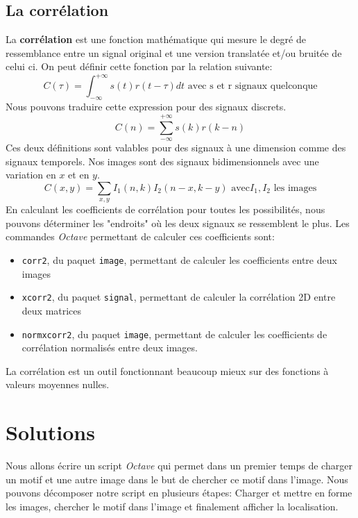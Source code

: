 \documentclass[a4paper,12pt,titlepage]{report}
\newcommand{\octave}{\textit{Octave }}
\begin{document}
		\subsection{La corrélation}
		La \textbf{corrélation} est une fonction mathématique qui mesure le degré de ressemblance entre un signal original et une version translatée et/ou bruitée de celui ci. On peut définir cette fonction par la relation suivante:
		\begin{equation}
			C(\tau)=\int_{-\infty}^{+\infty}s(t)r(t-\tau)dt \text{ avec s et r signaux quelconque}
		\end{equation}
		Nous pouvons traduire cette expression pour des signaux discrets.
		\begin{equation}
			C(n)=\sum_{-\infty}^{+\infty}s(k)r(k-n)	
		\end{equation}		
		Ces deux définitions sont valables pour des signaux à une dimension comme des signaux temporels. Nos images sont des signaux bidimensionnels avec une variation en $x$ et en $y$.
		\begin{equation}
			C(x,y)=\sum_{x,y} I_1(n,k)I_2(n-x,k-y) \text{ avec}I_1, I_2 \text{ les images}
		\end{equation}
		En calculant les coefficients de corrélation pour toutes les possibilités, nous pouvons déterminer les "endroits" où les deux signaux se ressemblent le plus.
		Les commandes \octave permettant de calculer ces coefficients sont:
		\begin{itemize}
		\item \texttt{corr2}, du paquet \texttt{image}, permettant de calculer les coefficients entre deux images
		\item \texttt{xcorr2}, du paquet \texttt{signal}, permettant de calculer la corrélation 2D entre deux matrices
		\item \texttt{normxcorr2}, du paquet \texttt{image}, permettant de calculer les coefficients de corrélation normalisés entre deux images. 
		\end{itemize}		
		La corrélation est un outil fonctionnant beaucoup mieux sur des fonctions à valeurs moyennes nulles.
	\section{Solutions}
	Nous allons écrire un script \octave qui permet dans un premier temps de charger un motif et une autre image dans le but de chercher ce motif dans l'image. Nous pouvons décomposer notre script en plusieurs étapes: Charger et mettre en forme les images, chercher le motif dans l'image et finalement afficher la localisation.
\end{document}

